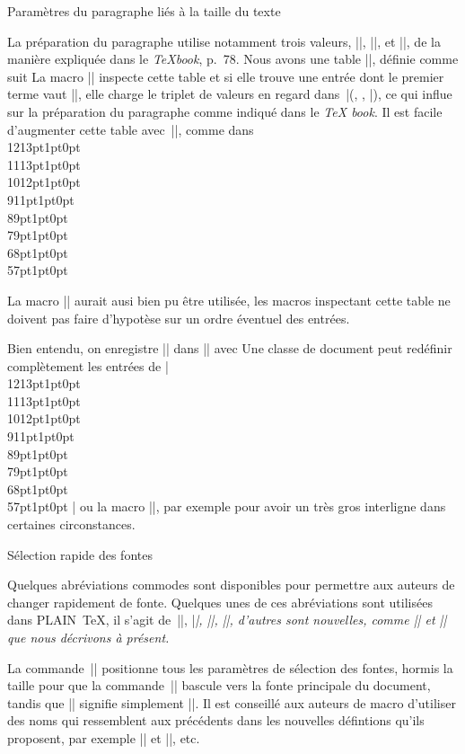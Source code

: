 \formalpar Paramètres du paragraphe liés à la taille du texte

La préparation du paragraphe utilise notamment trois valeurs,
|\normalbaselineskip|, |\normallineskip|, et |\lineskiplimit|, de la
manière expliquée dans le {\sl\TeX book}, p.~78. Nous avons une table
|\lineskiptable|, définie comme suit
\begincode
\def\lineskiptable{%
  \\{{12}{{13pt}{1pt}{0pt}}}%
  \\{{11}{{13pt}{1pt}{0pt}}}%
  \\{{10}{{12pt}{1pt}{0pt}}}%
  \\{{9}{{11pt}{1pt}{0pt}}}%
  \\{{8}{{9pt}{1pt}{0pt}}}%
  \\{{7}{{9pt}{1pt}{0pt}}}%
  \\{{6}{{8pt}{1pt}{0pt}}}%
  \\{{5}{{7pt}{1pt}{0pt}}}%
}
\endcode
La macro |\lineskipadjust| inspecte cette table et si elle
trouve une entrée dont le premier terme vaut |\textsize|, elle
charge le triplet de valeurs en regard
dans~|(\normalbaselineskip, \normallineskip, \lineskiplimit|), ce qui
influe sur la préparation du paragraphe comme indiqué dans le {\sl\TeX
book}. Il est facile d'augmenter cette table avec~|\leftappenditem|,
comme dans
\begincode
{}\to\lineskiptable
\endcode
La macro |\rightappenditem| aurait ausi bien pu être utilisée, les
macros inspectant cette table ne doivent pas faire d'hypotèse sur un
ordre éventuel des entrées.

Bien entendu, on enregistre |\lineskipadjust| dans |\textsizeadjust|
avec
\begincode
\addhook\lineskipadjust\to\textsizeadjust
\endcode
Une classe de document peut redéfinir complètement les entrées de
|\lineskiptable| ou la macro |\lineskipadjust|, par exemple pour avoir
un très gros interligne dans certaines circonstances.


\formalpar Sélection rapide des fontes

Quelques abréviations commodes sont disponibles pour permettre aux
auteurs de changer rapidement de fonte. Quelques unes de ces
abréviations sont utilisées dans PLAIN~\TeX, il s'agit de~|\rm|,
|\it|, |\sl|, |\sc|, d'autres sont nouvelles, comme |\mainfont| et
|\mainfontselect| que nous décrivons à présent.

La commande~|\mainfont| positionne tous les paramètres de sélection
des fontes, hormis la taille pour que la commande~|\fontselect|
bascule vers la fonte principale du document, tandis que
|\mainfontselect| signifie simplement |\mainfont\fontselect|. Il est
conseillé aux auteurs de macro d'utiliser des noms qui ressemblent aux
précédents dans les nouvelles défintions qu'ils proposent, par exemple
|\footnotefont| et |\footnotefontselect|, etc.

